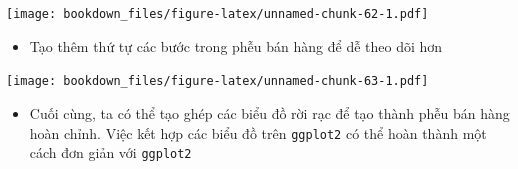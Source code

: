 \documentclass[]{krantz}
\makeatletter
\newenvironment{Shaded}{\begin{snugshade}}{\end{snugshade}}
\newcommand{\DataTypeTok}[1]{\textcolor[rgb]{0.27,0.27,0.27}{#1}}
\newcommand{\DecValTok}[1]{\textcolor[rgb]{0.06,0.06,0.06}{#1}}
\newcommand{\KeywordTok}[1]{\textcolor[rgb]{0.27,0.27,0.27}{\textbf{#1}}}
\newcommand{\NormalTok}[1]{#1}
\newcommand{\OperatorTok}[1]{\textcolor[rgb]{0.43,0.43,0.43}{\textbf{#1}}}
\newcommand{\StringTok}[1]{\textcolor[rgb]{0.5,0.5,0.5}{#1}}
\providecommand{\tightlist}{%
  \setlength{\itemsep}{0pt}\setlength{\parskip}{0pt}}
\newenvironment{kframe}{%
\medskip{}
\setlength{\fboxsep}{.8em}
 \def\at@end@of@kframe{}%
 \ifinner\ifhmode%
  \def\at@end@of@kframe{\end{minipage}}%
  \begin{minipage}{\columnwidth}%
 \fi\fi%
 \def\FrameCommand##1{\hskip\@totalleftmargin \hskip-\fboxsep
 \colorbox{shadecolor}{##1}\hskip-\fboxsep
     \hskip-\linewidth \hskip-\@totalleftmargin \hskip\columnwidth}%
 \MakeFramed {\advance\hsize-\width
   \@totalleftmargin\z@ \linewidth\hsize
   \@setminipage}}%
 {\par\unskip\endMakeFramed%
 \at@end@of@kframe}
\renewenvironment{Shaded}{\begin{kframe}}{\end{kframe}}
\renewenvironment{Shaded}{\begin{snugshade}}{\end{snugshade}}
\renewcommand{\DataTypeTok}[1]{\textcolor[rgb]{0.13,0.29,0.53}{#1}}
\renewcommand{\DecValTok}[1]{\textcolor[rgb]{0.00,0.00,0.81}{#1}}
\renewcommand{\KeywordTok}[1]{\textcolor[rgb]{0.13,0.29,0.53}{\textbf{#1}}}
\renewcommand{\NormalTok}[1]{#1}
\renewcommand{\OperatorTok}[1]{\textcolor[rgb]{0.81,0.36,0.00}{\textbf{#1}}}
\renewcommand{\StringTok}[1]{\textcolor[rgb]{0.31,0.60,0.02}{#1}}
\theoremstyle{definition}
\theoremstyle{definition}
\theoremstyle{definition}
\theoremstyle{remark}
\makeatother
\begin{document}
\texttt{[image: bookdown\_files/figure-latex/unnamed-chunk-62-1.pdf]}

\begin{itemize}
\tightlist
\item
  Tạo thêm thứ tự các bước trong phễu bán hàng để dễ theo dõi hơn
\end{itemize}

\begin{Shaded}
\end{Shaded}

\texttt{[image: bookdown\_files/figure-latex/unnamed-chunk-63-1.pdf]}

\begin{itemize}
\tightlist
\item
  Cuối cùng, ta có thể tạo ghép các biểu đồ rời rạc để tạo thành phễu
  bán hàng hoàn chỉnh. Việc kết hợp các biểu đồ trên \texttt{ggplot2} có
  thể hoàn thành một cách đơn giản với \texttt{ggplot2}
\end{itemize}
\end{document}
